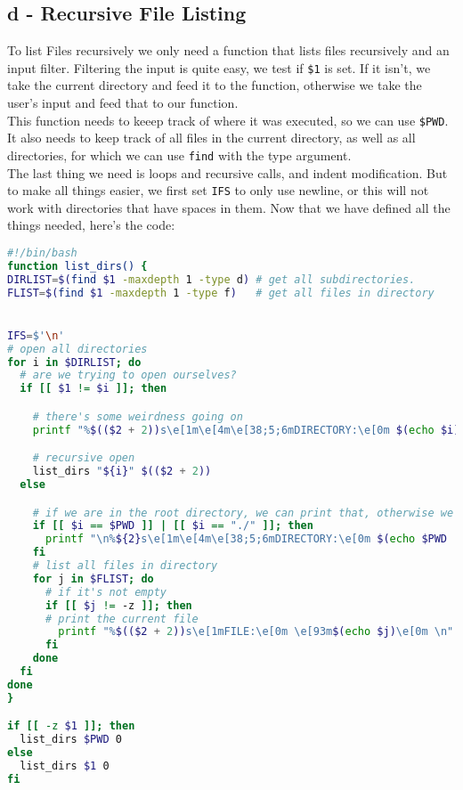\documentclass[a4paper, 11pt]{article}
\begin{document}
    \subsection{d - Recursive File Listing}
    To list Files recursively we only need a function that lists files recursively and an input filter.
    Filtering the input is quite easy, we test if \lstinline{$1} is set. If it isn't, we take the current 
    directory and feed it to the function, otherwise we take the user's input and feed that to our function.\\
    This function needs to keeep track of where it was executed, so we can use \lstinline{$PWD}. 
    It also needs to keep track of all files in the current directory, as well as all directories, for which we can 
    use \lstinline{find} with the type argument.\\
    The last thing we need is loops and recursive calls, and indent modification. But to make all things easier,
    we first set \texttt{IFS} to only use newline, or this will not work with directories that have spaces in them.
    Now that we have defined all the things needed, here's the code:\newpage
    \begin{lstlisting}[language=Bash]
#!/bin/bash
function list_dirs() {
DIRLIST=$(find $1 -maxdepth 1 -type d) # get all subdirectories. 
FLIST=$(find $1 -maxdepth 1 -type f)   # get all files in directory


IFS=$'\n'
# open all directories
for i in $DIRLIST; do
  # are we trying to open ourselves?
  if [[ $1 != $i ]]; then

    # there's some weirdness going on
    printf "%$(($2 + 2))s\e[1m\e[4m\e[38;5;6mDIRECTORY:\e[0m $(echo $i) \n"

    # recursive open
    list_dirs "${i}" $(($2 + 2))
  else

    # if we are in the root directory, we can print that, otherwise we don't care
    if [[ $i == $PWD ]] | [[ $i == "./" ]]; then
      printf "\n%${2}s\e[1m\e[4m\e[38;5;6mDIRECTORY:\e[0m $(echo $PWD | sed 's_^.^/\b__') \n"
    fi
    # list all files in directory
    for j in $FLIST; do
      # if it's not empty
      if [[ $j != -z ]]; then
      # print the current file
        printf "%$(($2 + 2))s\e[1mFILE:\e[0m \e[93m$(echo $j)\e[0m \n"
      fi
    done
  fi
done
}

if [[ -z $1 ]]; then
  list_dirs $PWD 0
else
  list_dirs $1 0
fi
    \end{lstlisting}

    \newpage
\end{document}
